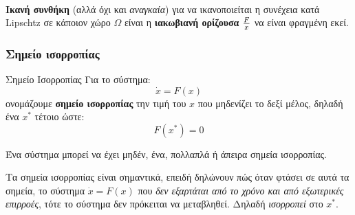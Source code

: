 \documentclass[11pt,a4paper,notitlepage,fleqn]{article}
\begin{document}
\paragraph{}
\textbf{Ικανή συνθήκη} (αλλά όχι και \textit{αναγκαία}) για να ικανοποιείται η συνέχεια
κατά Lipschtz σε κάποιον χώρο \( \Omega \) είναι η \textbf{ιακωβιανή ορίζουσα} \( \frac{F}{x} \) να είναι φραγμένη εκεί.

\subsubsection{Σημείο ισορροπίας}
\begin{defn}{Σημείο Ισορροπίας}{}
	Για το σύστημα:\[
	\dot x = F(x)
	\]
	ονομάζουμε \textbf{σημείο ισορροπίας} την τιμή του \( x \) που μηδενίζει το δεξί μέλος,
	δηλαδή ένα \( x^* \) τέτοιο ώστε:
	\[
	F(x^*) = 0
	\]
	
	Ένα σύστημα μπορεί να έχει μηδέν, ένα, πολλαπλά ή άπειρα σημεία ισορροπίας.
\end{defn}

Τα σημεία ισορροπίας είναι σημαντικά, επειδή δηλώνουν πώς όταν φτάσει σε αυτά τα σημεία, το σύστημα
\( \dot x = F(x) \) που \textit{δεν εξαρτάται από το χρόνο και από εξωτερικές επιρροές},
τότε το σύστημα δεν πρόκειται να μεταβληθεί. Δηλαδή \textit{ισορροπεί} στο \( x^* \).
\end{document}
